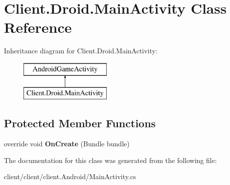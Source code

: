 \hypertarget{classClient_1_1Droid_1_1MainActivity}{\section{Client.\-Droid.\-Main\-Activity Class Reference}
\label{classClient_1_1Droid_1_1MainActivity}
}
Inheritance diagram for Client.\-Droid.\-Main\-Activity\-:\begin{figure}[H]
\begin{center}
\leavevmode
\includegraphics[height=2.000000cm]{classClient_1_1Droid_1_1MainActivity}
\end{center}
\end{figure}
\subsection*{Protected Member Functions}
\begin{DoxyCompactItemize}
\item 
\hypertarget{classClient_1_1Droid_1_1MainActivity_a81c1652b05e56f45d7d6291f2fee2e3a}{override void {\bfseries On\-Create} (Bundle bundle)}\label{classClient_1_1Droid_1_1MainActivity_a81c1652b05e56f45d7d6291f2fee2e3a}

\end{DoxyCompactItemize}


The documentation for this class was generated from the following file\-:\begin{DoxyCompactItemize}
\item 
client/client/client.\-Android/Main\-Activity.\-cs\end{DoxyCompactItemize}
